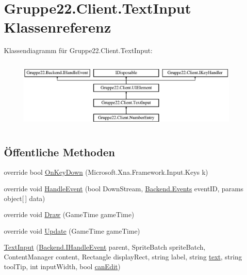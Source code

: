 \hypertarget{class_gruppe22_1_1_client_1_1_text_input}{\section{Gruppe22.\-Client.\-Text\-Input Klassenreferenz}
\label{class_gruppe22_1_1_client_1_1_text_input}
}
Klassendiagramm für Gruppe22.\-Client.\-Text\-Input\-:\begin{figure}[H]
\begin{center}
\leavevmode
\includegraphics[height=3.589744cm]{class_gruppe22_1_1_client_1_1_text_input}
\end{center}
\end{figure}
\subsection*{Öffentliche Methoden}
\begin{DoxyCompactItemize}
\item 
override bool \hyperlink{class_gruppe22_1_1_client_1_1_text_input_aa1122f9fe72ced8d5673e20e279beff4}{On\-Key\-Down} (Microsoft.\-Xna.\-Framework.\-Input.\-Keys k)
\item 
override void \hyperlink{class_gruppe22_1_1_client_1_1_text_input_ac687504d29f26d40baefd69fb9537d92}{Handle\-Event} (bool Down\-Stream, \hyperlink{namespace_gruppe22_1_1_backend_ab56df91bb0bdafa1ea978e552209ce73}{Backend.\-Events} event\-I\-D, params object\mbox{[}$\,$\mbox{]} data)
\item 
override void \hyperlink{class_gruppe22_1_1_client_1_1_text_input_a39d2aeb6a1bf78d643688d79d009c3ae}{Draw} (Game\-Time game\-Time)
\item 
override void \hyperlink{class_gruppe22_1_1_client_1_1_text_input_aeb12ff2ec36009368ef79b71eb39fa73}{Update} (Game\-Time game\-Time)
\item 
\hyperlink{class_gruppe22_1_1_client_1_1_text_input_aec93a57386f2255d76e0134241bcd1be}{Text\-Input} (\hyperlink{interface_gruppe22_1_1_backend_1_1_i_handle_event}{Backend.\-I\-Handle\-Event} parent, Sprite\-Batch sprite\-Batch, Content\-Manager content, Rectangle display\-Rect, string label, string \hyperlink{class_gruppe22_1_1_client_1_1_text_input_a795e9f3cdc6b089dc1cc864907b33f44}{text}, string tool\-Tip, int input\-Width, bool \hyperlink{class_gruppe22_1_1_client_1_1_text_input_ae512171e8f7caead8c28eb9327ccbf40}{can\-Edit})
\end{DoxyCompactItemize}
